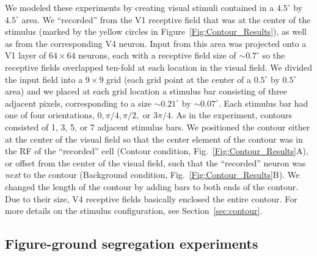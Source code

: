 We modeled these experiments by creating visual stimuli contained in a
$4.5^{\circ}$ by $4.5^{\circ}$ area. We ``recorded'' from the V1 receptive
field that was at the center of the stimulus (marked by the yellow circles in Figure~\ref{Fig:Contour_Results}), as well as from the
corresponding V4 neuron. Input from this area was projected onto a V1 layer of $64 \times 64$ neurons, each with a receptive field size of $\sim0.7^{\circ}$ so the receptive fields overlapped ten-fold at each location in the visual field.  We divided the input field into a $9 \times 9$ grid (each grid point at the center of a $0.5^{\circ}$ by $0.5^{\circ}$ area) and we placed at each grid location a stimulus bar 
consisting of three adjacent pixels, corresponding to a size $\sim0.21^{\circ}$ by $\sim0.07^{\circ}$. Each stimulus bar had one of four orientations, $0, \pi/4, \pi/2,$ or $3\pi/4$.  As in the \cite{Chen_etal14} experiment, contours consisted of 1, 3, 5, or 7 adjacent stimulus bars. We positioned the contour either at the center of the visual field so that the center element of the contour was in the RF of the ``recorded'' cell (Contour condition, Fig.~\ref{Fig:Contour_Results}A), or offset from the center of the
visual field, such that the ``recorded'' neuron was {\em next} to the
contour (Background condition, Fig.~\ref{Fig:Contour_Results}B). We changed the length of the contour by adding bars to both ends of the contour. Due to their size, V4 receptive fields basically enclosed the entire contour. For more details on the stimulus configuration, see Section~\ref{sec:contour}.

\subsection{Figure-ground segregation experiments} 
\label{sec:FGO}

